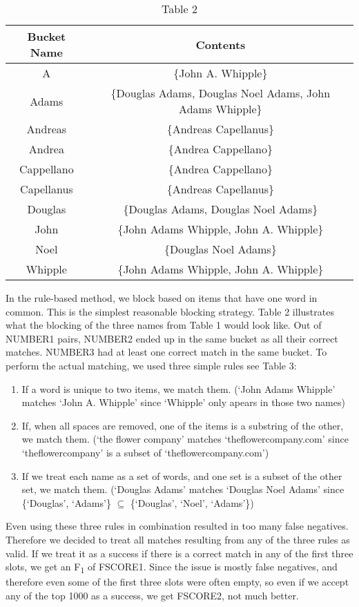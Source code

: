 \documentclass{vldb}
\begin{document}
\begin{table*}
\centering
\caption{Table 2}
\begin{tabular}{|c|c|} \hline
Bucket Name&Contents\\ \hline
A&\{John A. Whipple\} \\ \hline
Adams&\{Douglas Adams, Douglas Noel Adams, John Adams Whipple\} \\ \hline
Andreas&\{Andreas Capellanus\} \\ \hline
Andrea&\{Andrea Cappellano\} \\ \hline
Cappellano&\{Andrea Cappellano\} \\ \hline
Capellanus&\{Andreas Capellanus\} \\ \hline
Douglas&\{Douglas Adams, Douglas Noel Adams\} \\ \hline
John&\{John Adams Whipple, John A. Whipple\} \\ \hline
Noel&\{Douglas Noel Adams\} \\ \hline
Whipple&\{John Adams Whipple, John A. Whipple\} \\
\hline\end{tabular}
\end{table*}

In the rule-based method, we block based on items that have one word in common. This is the simplest reasonable blocking strategy. Table 2 illustrates what the blocking of the three names from Table 1 would look like. Out of NUMBER1 pairs, NUMBER2 ended up in the same bucket as all their correct matches. NUMBER3 had at least one correct match in the same bucket. To perform the actual matching, we used three simple rules see Table 3:
\begin{enumerate}

\item If a word is unique to two items, we match them. (`John Adams Whipple' matches `John A. Whipple' since `Whipple' only apears in those two names)
\item If, when all spaces are removed, one of the items is a substring of the other, we match them. (`the flower company' matches `theflowercompany.com' since `theflowercompany' is a subset of `theflowercompany.com')
\item If we treat each name as a set of words, and one set is a subset of the other set, we match them. (`Douglas Adams' matches `Douglas Noel Adams' since \{`Douglas', `Adams'\} $\subseteq$ \{`Douglas', `Noel', `Adams'\})

\end{enumerate} 
Even using these three rules in combination resulted in too many false negatives. Therefore we decided to treat all matches resulting from any of the three rules as valid. If we treat it as a success if there is a correct match in any of the first three slots, we get an F\textsubscript{1} of FSCORE1. Since the issue is mostly false negatives, and therefore even some of the first three slots were often empty, so even if we accept any of the top 1000 as a success, we get FSCORE2, not much better.
\end{document}
